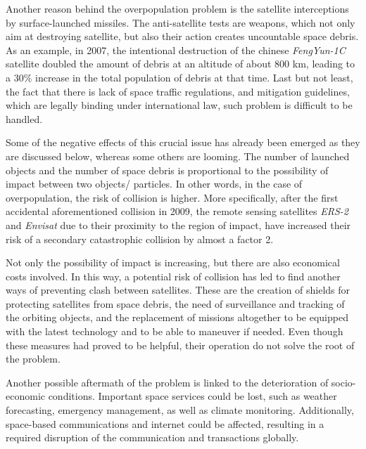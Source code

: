 Another reason behind the overpopulation problem is the satellite interceptions by surface-launched missiles. The anti-satellite tests are weapons, which not only aim at destroying satellite, but also their action creates uncountable space debris. As an example, in 2007, the intentional destruction of the chinese \textit{FengYun-1C} satellite doubled the amount of debris at an altitude of about 800 km, leading to a 30\% increase in the total population of debris at that time. \cite{Anti-satellite} Last but not least, the fact that there is lack of space traffic regulations, and mitigation guidelines, which are legally binding under international law, such problem is difficult to be handled.

\bigskip

Some of the negative effects of this crucial issue has already been emerged as they are discussed below, whereas some others are looming. The number of launched objects and the number of space debris is proportional to the possibility of impact between two objects/ particles. In other words, in the case of overpopulation, the risk of collision is higher. More specifically, after the first accidental aforementioned collision in 2009, the remote sensing satellites \textit{ERS-2} and \textit{Envisat} due to their proximity to the region of impact, have increased their risk of a secondary catastrophic collision by almost a factor 2. \cite{Klinkrad 2009}

Not only the possibility of impact is increasing, but there are also economical costs involved. In this way, a potential risk of collision has led to find another ways of preventing clash between satellites. These are the creation of shields for protecting satellites from space debris, the need of surveillance and tracking of the orbiting objects, and the replacement of missions altogether to be equipped with the latest technology and to be able to maneuver if needed. Even though these measures had proved to be helpful, their operation do not solve the root of the problem.

Another possible aftermath of the problem is linked to the deterioration of socio-economic conditions. Important space services could be lost, such as weather forecasting, emergency management, as well as climate monitoring. Additionally, space-based communications and internet could be affected, resulting in a required disruption of the communication and transactions globally. \cite{Undseth}

\bigskip

